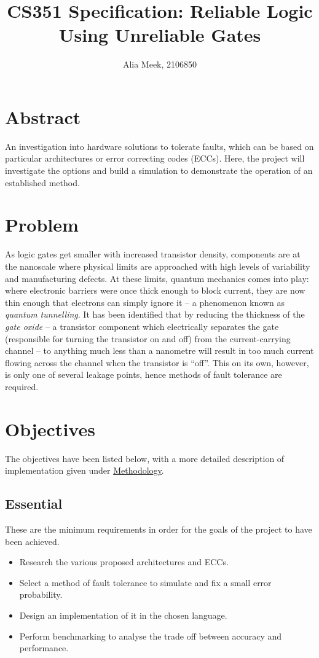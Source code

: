 \documentclass[12pt,a4paper]{article}
\title{CS351 Specification: Reliable Logic Using Unreliable Gates}
\author{Alia Meek, 2106850}
\date{}
\begin{document}
\maketitle

\section{Abstract}
An investigation into hardware solutions to tolerate faults, which can be based on particular architectures or error 
correcting codes (ECCs). Here, the project will investigate the options and build a simulation to demonstrate the 
operation of an established method.


\section{Problem}
As logic gates get smaller with increased transistor density, components are at the nanoscale where physical limits 
are approached with high levels of variability and manufacturing defects. At these limits, quantum mechanics comes 
into play: where electronic barriers were once thick enough to block current, they are now thin enough that electrons 
can simply ignore it -- a phenomenon known as \emph{quantum tunnelling}. It has been identified that by reducing the 
thickness of the \emph{gate oxide} -- a transistor component which electrically separates the gate (responsible for 
turning the transistor on and off) from the current-carrying channel -- to anything much less than a nanometre will 
result in too much current flowing across the channel when the transistor is “off”. This on its own, however, is 
only one of several leakage points, hence methods of fault tolerance are required.


\section{Objectives}
The objectives have been listed below, with a more detailed description of implementation given under 
\hyperref[sec:meth]{Methodology}.

\subsection{Essential}
These are the minimum requirements in order for the goals of the project to have been achieved.
\begin{itemize}
    \item Research the various proposed architectures and ECCs.
    \item Select a method of fault tolerance to simulate and fix a small error probability.
    \item Design an implementation of it in the chosen language.
    \item Perform benchmarking to analyse the trade off between accuracy and performance.
\end{itemize}
\end{document}
